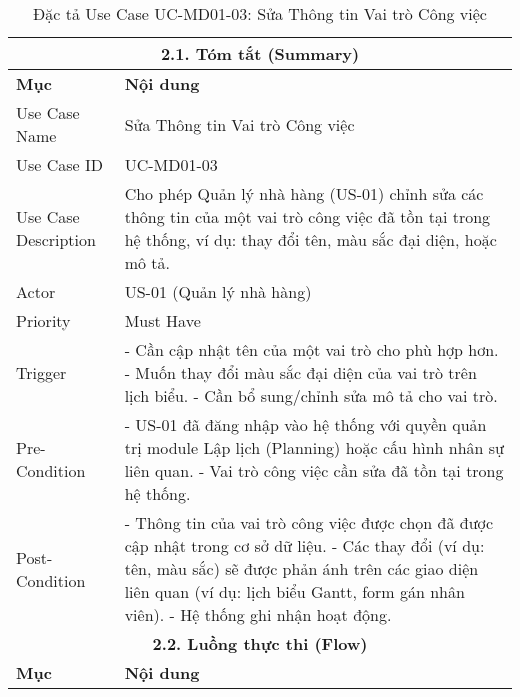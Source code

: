 \begin{longtable}{|m{4cm}|p{11cm}|}
\caption{Đặc tả Use Case UC-MD01-03: Sửa Thông tin Vai trò Công việc} \label{tab:uc_md01_03_revised} \\
\hline
\multicolumn{2}{|c|}{\textbf{2.1. Tóm tắt (Summary)}} \\
\hline
\textbf{Mục} & \textbf{Nội dung} \\
\hline
\endhead %
\hline
\endfoot %
\hline
\endlastfoot %
Use Case Name & Sửa Thông tin Vai trò Công việc \\
\hline
Use Case ID & UC-MD01-03 \\
\hline
Use Case Description & Cho phép Quản lý nhà hàng (US-01) chỉnh sửa các thông tin của một vai trò công việc đã tồn tại trong hệ thống, ví dụ: thay đổi tên, màu sắc đại diện, hoặc mô tả. \\
\hline
Actor & US-01 (Quản lý nhà hàng) \\
\hline
Priority & Must Have \\
\hline
Trigger & - Cần cập nhật tên của một vai trò cho phù hợp hơn. \newline - Muốn thay đổi màu sắc đại diện của vai trò trên lịch biểu. \newline - Cần bổ sung/chỉnh sửa mô tả cho vai trò. \\
\hline
Pre-Condition & - US-01 đã đăng nhập vào hệ thống với quyền quản trị module Lập lịch (Planning) hoặc cấu hình nhân sự liên quan. \newline - Vai trò công việc cần sửa đã tồn tại trong hệ thống. \\
\hline
Post-Condition & - Thông tin của vai trò công việc được chọn đã được cập nhật trong cơ sở dữ liệu. \newline - Các thay đổi (ví dụ: tên, màu sắc) sẽ được phản ánh trên các giao diện liên quan (ví dụ: lịch biểu Gantt, form gán nhân viên). \newline - Hệ thống ghi nhận hoạt động. \\
\hline
\multicolumn{2}{|c|}{\textbf{2.2. Luồng thực thi (Flow)}} \\
\hline
\textbf{Mục} & \textbf{Nội dung} \\
\hline

\end{longtable}
